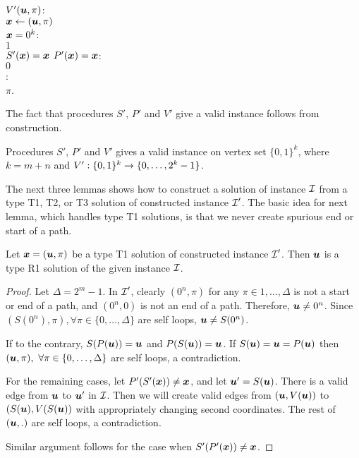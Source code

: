 \begin{algo}
  \underline{$V'(\mbox{\boldmath $u$},\pi)$}:\+
  \\$\mbox{\boldmath $x$} \gets (\mbox{\boldmath $u$},\pi)$
  \\\IfB $\mbox{\boldmath $x$}=0^k$:\+
  \\  \ReturnB $1$\-
  \\\ElseIfB $S'(\mbox{\boldmath $x$}) = \mbox{\boldmath $x$}$ \AndB $P'(\mbox{\boldmath $x$})=\mbox{\boldmath $x$}$:\+
  \\  \ReturnB $0$\-
  \\\ElseB:\quad{}\+
  \\  \ReturnB $\pi$.\-
\end{algo}

The fact that procedures $S'$, $P'$ and $V'$ give a valid \EOML instance follows from construction.
\begin{lemma}\label{lem:p2m-valid}
Procedures $S'$, $P'$ and $V'$ gives a valid \EOML instance on vertex set $\{0,1\}^k$, where $k=m+n$ and $V':\{0,1\}^k\rightarrow \{0,\dots, 2^k-1\}$.
\end{lemma}

The next three lemmas shows how to construct a solution of \EOPL instance $\mbox{${\mathcal I}$}$ from a type T1, T2, or T3 solution of constructed \EOML instance $\mbox{${\mathcal I}$}'$.
The basic idea for next lemma, which handles type T1 solutions, is that we never create spurious end or start of a path. 
\begin{lemma}\label{lem:p2m-t1}
Let $\mbox{\boldmath $x$}=(\mbox{\boldmath $u$},\pi)$ be a type T1 solution of constructed \EOML instance $\mbox{${\mathcal I}$}'$. Then $\mbox{\boldmath $u$}$ is a type R1 solution of the given \EOPL instance $\mbox{${\mathcal I}$}$.
\end{lemma}

\begin{proof}
Let $\Delta=2^m-1$.
In $\mbox{${\mathcal I}$}'$, clearly $(0^n,\pi)$ for any $\pi \in {1,\dots, \Delta}$ is not a start or end of a path, and $(0^n,0)$ is not an end of a path. Therefore, $\mbox{\boldmath $u$}\neq 0^n$. Since $(S(0^n),\pi), \forall \pi\in \{0,\dots,\Delta\}$ are self loops, $\mbox{\boldmath $u$} \neq S(0^n)$.

If to the contrary, $S(P(\mbox{\boldmath $u$}))=\mbox{\boldmath $u$}$ and $P(S(\mbox{\boldmath $u$}))=\mbox{\boldmath $u$}$. If $S(\mbox{\boldmath $u$})=\mbox{\boldmath $u$}=P(\mbox{\boldmath $u$})$ then $(\mbox{\boldmath $u$},\pi),\ \forall \pi\in\{0,\dots,\Delta\}$ are self loops, a contradiction. 

For the remaining cases, let $P'(S'(\mbox{\boldmath $x$}))\neq \mbox{\boldmath $x$}$, and let $\mbox{\boldmath $u$}'=S(\mbox{\boldmath $u$})$. There is a valid edge from $\mbox{\boldmath $u$}$ to $\mbox{\boldmath $u$}'$ in $\mbox{${\mathcal I}$}$. Then we will create valid edges from $(\mbox{\boldmath $u$},V(\mbox{\boldmath $u$}))$ to $(S(\mbox{\boldmath $u$}),V(S(\mbox{\boldmath $u$}))$ with appropriately changing second coordinates. The rest of $(\mbox{\boldmath $u$},.)$ are self loops, a contradiction. 

Similar argument follows for the case when $S'(P'(\mbox{\boldmath $x$}))\neq \mbox{\boldmath $x$}$. 
\end{proof}


